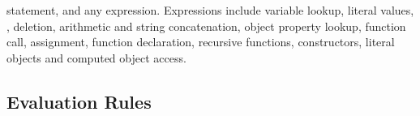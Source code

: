 \documentclass{article}
\begin{document}
  statement, and any expression.
Expressions include variable lookup, literal values, , deletion, 
arithmetic and string concatenation, object property lookup, function call, assignment, 
function declaration, recursive functions, constructors, literal objects and computed object access.
%


















\subsection{Evaluation Rules}\label{sec:semantics}
\end{document}
